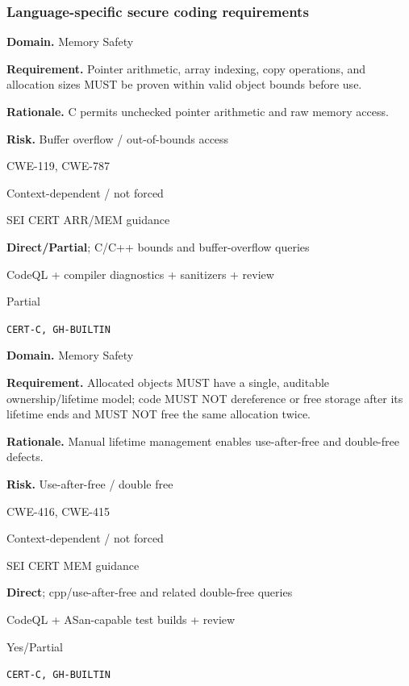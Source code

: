 \documentclass[10pt,letterpaper]{article}
\newcommand{\prioritybadge}[2]{\tcbox[on line,boxrule=0pt,arc=1.2mm,boxsep=0.7mm,left=1mm,right=1mm,top=0.4mm,bottom=0.4mm,colback=#2!12,coltext=#2]{\scriptsize\bfseries #1}}
\begin{document}
\subsubsection*{Language-specific secure coding requirements}

\begin{rulebox}[title={\texttt{SCS-C-MEM-001} \hfill \prioritybadge{Critical Control}{Critical}}]
\textbf{Domain.} Memory Safety

\textbf{Requirement.} Pointer arithmetic, array indexing, copy operations, and allocation sizes MUST be proven within valid object bounds before use.

\textbf{Rationale.} C permits unchecked pointer arithmetic and raw memory access.

\textbf{Risk.} Buffer overflow / out-of-bounds access

\begin{description}[leftmargin=2.65cm,labelwidth=2.3cm,style=nextline,itemsep=1pt,topsep=3pt]
  \item[CWE] CWE-119, CWE-787
  \item[OWASP] Context-dependent / not forced
  \item[CERT] SEI CERT ARR/MEM guidance
  \item[CodeQL] \textbf{Direct/Partial}; C/C++ bounds and buffer-overflow queries
  \item[Enforcement] CodeQL + compiler diagnostics + sanitizers + review
  \item[Automation] Partial
  \item[Sources] \texttt{CERT-C, GH-BUILTIN}
\end{description}
\end{rulebox}

\begin{rulebox}[title={\texttt{SCS-C-MEM-002} \hfill \prioritybadge{Critical Control}{Critical}}]
\textbf{Domain.} Memory Safety

\textbf{Requirement.} Allocated objects MUST have a single, auditable ownership/lifetime model; code MUST NOT dereference or free storage after its lifetime ends and MUST NOT free the same allocation twice.

\textbf{Rationale.} Manual lifetime management enables use-after-free and double-free defects.

\textbf{Risk.} Use-after-free / double free

\begin{description}[leftmargin=2.65cm,labelwidth=2.3cm,style=nextline,itemsep=1pt,topsep=3pt]
  \item[CWE] CWE-416, CWE-415
  \item[OWASP] Context-dependent / not forced
  \item[CERT] SEI CERT MEM guidance
  \item[CodeQL] \textbf{Direct}; cpp/use-after-free and related double-free queries
  \item[Enforcement] CodeQL + ASan-capable test builds + review
  \item[Automation] Yes/Partial
  \item[Sources] \texttt{CERT-C, GH-BUILTIN}
\end{description}
\end{rulebox}
\end{document}
